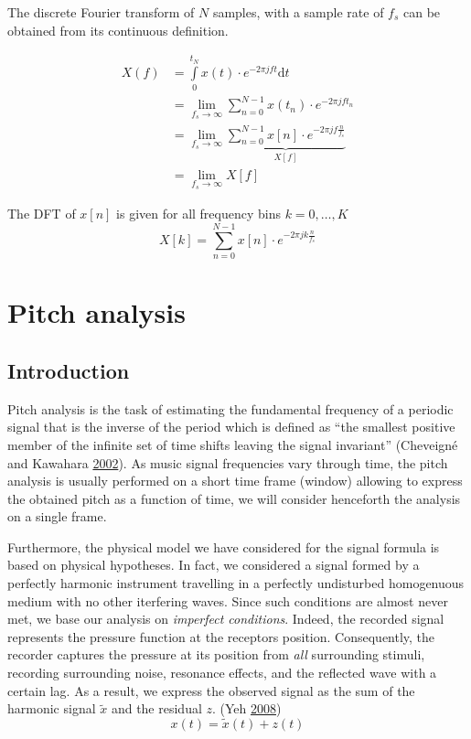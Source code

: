 \documentclass[
  american,
]{article}
\begin{document}
The discrete Fourier transform of \(N\) samples,
with a sample rate of \(f_s\) can be obtained
from its continuous definition.

\begin{align}
X(f) &= \int\limits_{0}^{t_N} x(t)\cdot e^{-2\pi j ft}\mathrm{d}t\\
    &= \lim\limits_{f_s\rightarrow\infty} \sum\limits_{n=0}^{N-1}
        x(t_n)\cdot e^{-2\pi j ft_n}\\
    &= \lim\limits_{f_s\rightarrow\infty} \underbrace{\sum\limits_{n=0}^{N-1} x[n]\cdot e^{-2\pi j f \frac{n}{f_s}}}_{X[f]}\\
    &= \lim\limits_{f_s\rightarrow\infty} X[f]
\end{align}

The DFT of \(x[n]\) is given for all frequency bins
\(k=0,\ldots,K\)
\[X[k] = \sum\limits_{n=0}^{N-1} x[n]\cdot e^{-2\pi j k \frac{n}{f_s}}\]

\pagebreak

\hypertarget{pitch-analysis}{%
\section{Pitch analysis}\label{pitch-analysis}}

\hypertarget{introduction-1}{%
\subsection{Introduction}\label{introduction-1}}

Pitch analysis is the task of estimating the fundamental
frequency of a periodic signal that is the inverse
of the period which is defined as
``the smallest positive member of the infinite set of time
shifts leaving the signal invariant'' (Cheveigné and Kawahara \protect\hyperlink{ref-yin_2002}{2002}).
As music signal frequencies vary through time,
the pitch analysis is usually performed on a short time frame (window)
allowing to express the obtained pitch as a function of time,
we will consider henceforth the analysis on a single frame.

Furthermore, the physical model we have considered
for the signal formula is based on physical hypotheses.
In fact, we considered a signal formed by a perfectly
harmonic instrument travelling in a perfectly undisturbed
homogenuous medium with no other iterfering waves.
Since such conditions are almost never met, we base our
analysis on \emph{imperfect conditions}.
Indeed, the recorded signal represents the pressure function
at the receptors position.
Consequently, the recorder captures the pressure
at its position from \emph{all} surrounding stimuli,
recording surrounding noise, resonance effects,
and the reflected wave with a certain lag.
As a result, we express the observed signal
as the sum of the harmonic signal \(\tilde{x}\) and
the residual \(z\). (Yeh \protect\hyperlink{ref-yeh_thesis}{2008})
\[x(t) = \tilde{x}(t) + z(t)\]
\end{document}
